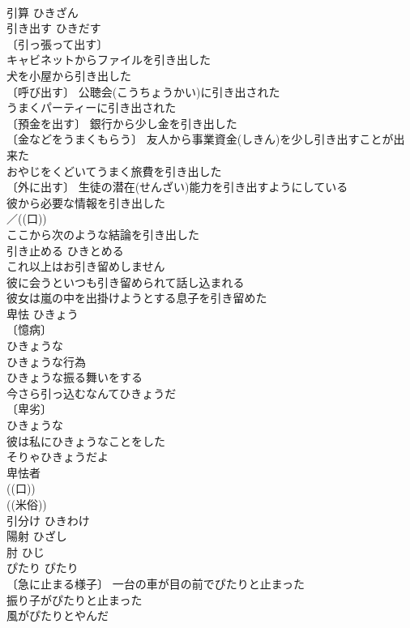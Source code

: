 \documentclass[8pt]{extreport}
\begin{document}
\begin{CJK}{UTF8}{min}
\\	引算	ひきざん	
\\	引き出す	ひきだす	
\\	〔引っ張って出す〕
\\	キャビネットからファイルを引き出した 
\\	犬を小屋から引き出した 
\\	〔呼び出す〕 公聴会(こうちょうかい)に引き出された 
\\	うまくパーティーに引き出された 
\\	〔預金を出す〕 銀行から少し金を引き出した 
\\	〔金などをうまくもらう〕 友人から事業資金(しきん)を少し引き出すことが出来た 
\\	おやじをくどいてうまく旅費を引き出した 
\\	〔外に出す〕 生徒の潜在(せんざい)能力を引き出すようにしている 
\\	彼から必要な情報を引き出した 
\\	／((口)) 
\\	ここから次のような結論を引き出した 
\\	引き止める	ひきとめる	
\\	これ以上はお引き留めしません 
\\	彼に会うといつも引き留められて話し込まれる 
\\	彼女は嵐の中を出掛けようとする息子を引き留めた 
\\	卑怯	ひきょう	
\\	〔憶病〕
\\	ひきょうな 
\\	ひきょうな行為 
\\	ひきょうな振る舞いをする 
\\	今さら引っ込むなんてひきょうだ 
\\	〔卑劣〕
\\	ひきょうな 
\\	彼は私にひきょうなことをした 
\\	そりゃひきょうだよ 
\\	卑怯者 
\\	((口)) 
\\	((米俗)) 
\\	引分け	ひきわけ	
\\	陽射	ひざし	
\\	肘	ひじ	
\\	ぴたり	ぴたり	
\\	〔急に止まる様子〕 一台の車が目の前でぴたりと止まった 
\\	振り子がぴたりと止まった 
\\	風がぴたりとやんだ 

\end{CJK}
\end{document}
